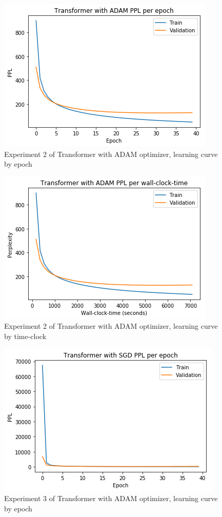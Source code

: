 \begin{itemize}
\begin{figure}[H]
	\centering
	\includegraphics[scale=0.8]{Q4-2_TR_ADAM_epoch.png}
	\caption{Experiment 2 of Transformer with ADAM optimizer, learning curve by epoch}
	\label{fig:fig15}
\end{figure}

\begin{figure}[H]
	\centering
	\includegraphics[scale=0.8]{Q4-2_TR_ADAM_clock.png}
	\caption{Experiment 2 of Transformer with ADAM optimizer, learning curve by time-clock}
	\label{fig:fig16}
\end{figure}

\begin{figure}[H]
	\centering
	\includegraphics[scale=0.8]{Q4-2_TR_SGD_epoch.png}
	\caption{Experiment 3 of Transformer with ADAM optimizer, learning curve by epoch}
	\label{fig:fig17}
\end{figure}


\end{itemize}
